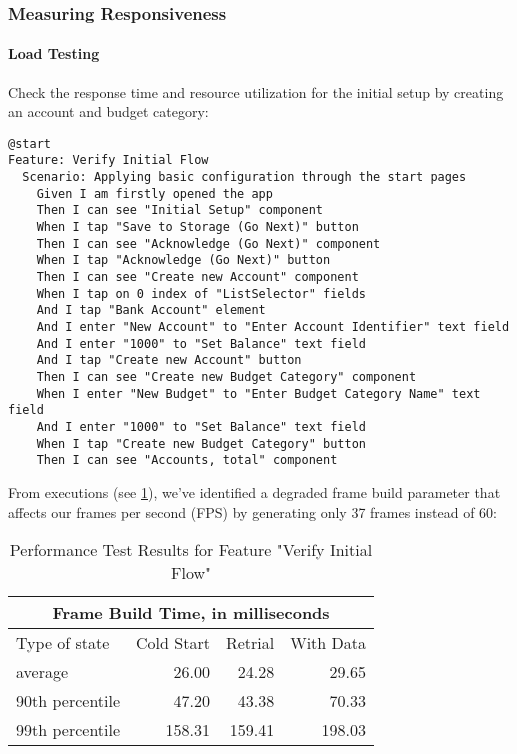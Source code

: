 \subsubsection{Measuring Responsiveness}
\paragraph{Load Testing}

Check the response time and resource utilization for the initial setup by creating an account and budget category:

\begin{lstlisting}[language=cucumber]
@start
Feature: Verify Initial Flow
  Scenario: Applying basic configuration through the start pages
    Given I am firstly opened the app
    Then I can see "Initial Setup" component
    When I tap "Save to Storage (Go Next)" button
    Then I can see "Acknowledge (Go Next)" component
    When I tap "Acknowledge (Go Next)" button
    Then I can see "Create new Account" component
    When I tap on 0 index of "ListSelector" fields
    And I tap "Bank Account" element
    And I enter "New Account" to "Enter Account Identifier" text field
    And I enter "1000" to "Set Balance" text field
    And I tap "Create new Account" button
    Then I can see "Create new Budget Category" component
    When I enter "New Budget" to "Enter Budget Category Name" text field
    And I enter "1000" to "Set Balance" text field
    When I tap "Create new Budget Category" button
    Then I can see "Accounts, total" component
\end{lstlisting}

\noindent From executions (see \cref{tb:frame-build}), we've identified a degraded frame build parameter that affects 
our frames per second (FPS) by generating only 37 frames instead of 60:\\

\begin{table}[h!]
  \begin{tabular}{ |p{6.8cm}||r|r|r|  }
    \hline
    \multicolumn{4}{|c|}{Frame Build Time, in milliseconds} \\
    \hline
    Type of state & Cold Start & Retrial & With Data\\
    \hline
    average          &  26.00 &  24.28 &  29.65 \\
    90th percentile  &  47.20 &  43.38 &  70.33 \\
    99th percentile  & 158.31 & 159.41 & 198.03 \\
    \hline
  \end{tabular}
  \caption{Performance Test Results for Feature "Verify Initial Flow"} \label{tb:frame-build}
\end{table}

